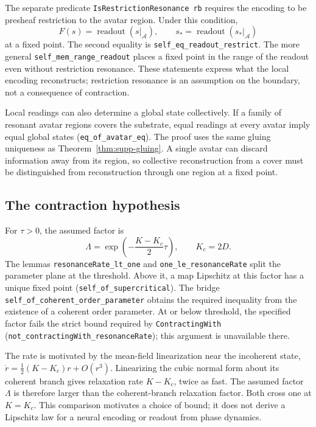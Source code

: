 \documentclass{article}
\begin{document}
The separate predicate \texttt{IsRestrictionResonance rb} requires the encoding to be presheaf restriction to the avatar region. Under this condition,
\[
F(s)=\operatorname{readout}(s|_{\mathcal{A}}),\qquad
s_* = \operatorname{readout}(s_*|_{\mathcal{A}})
\]
at a fixed point. The second equality is \nolinkurl{self_eq_readout_restrict}. The more general \nolinkurl{self_mem_range_readout} places a fixed point in the range of the readout even without restriction resonance. These statements express what the local encoding reconstructs; restriction resonance is an assumption on the boundary, not a consequence of contraction.

Local readings can also determine a global state collectively. If a family of resonant avatar regions covers the substrate, equal readings at every avatar imply equal global states (\nolinkurl{eq_of_avatar_eq}). The proof uses the same gluing uniqueness as Theorem~\ref{thm:supp-gluing}. A single avatar can discard information away from its region, so collective reconstruction from a cover must be distinguished from reconstruction through one region at a fixed point.

\subsection{The contraction hypothesis}

For $\tau>0$, the assumed factor is
\[
\Lambda=\exp\!\left(-\frac{K-K_c}{2}\tau\right),\qquad K_c=2D.
\]
The lemmas \nolinkurl{resonanceRate_lt_one} and \nolinkurl{one_le_resonanceRate} split the parameter plane at the threshold. Above it, a map Lipschitz at this factor has a unique fixed point (\nolinkurl{self_of_supercritical}). The bridge \nolinkurl{self_of_coherent_order_parameter} obtains the required inequality from the existence of a coherent order parameter. At or below threshold, the specified factor fails the strict bound required by \texttt{ContractingWith} (\nolinkurl{not_contractingWith_resonanceRate}); this argument is unavailable there.

The rate is motivated by the mean-field linearization near the incoherent state, $\dot r=\tfrac12(K-K_c)r+O(r^3)$. Linearizing the cubic normal form about its coherent branch gives relaxation rate $K-K_c$, twice as fast. The assumed factor $\Lambda$ is therefore larger than the coherent-branch relaxation factor. Both cross one at $K=K_c$. This comparison motivates a choice of bound; it does not derive a Lipschitz law for a neural encoding or readout from phase dynamics.
\end{document}
